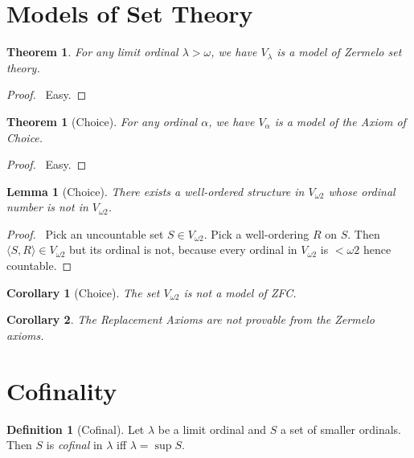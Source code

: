 \documentclass{article}
\let\qed\relax
\newtheorem{lemma}[axiom]{Lemma}
\newtheorem{theorem}[axiom]{Theorem}
\newtheorem{corollary}{Corollary}[axiom]
\theoremstyle{definition}
\newtheorem{definition}[axiom]{Definition}
\begin{document}
    \section{Models of Set Theory}

    \begin{theorem}
        For any limit ordinal $\lambda > \omega$, we have $V_\lambda$ is a model of Zermelo set theory.
    \end{theorem}

    \begin{proof}
        \pf\ Easy. \qed
    \end{proof}

    \begin{theorem}[Choice]
        For any ordinal $\alpha$, we have $V_\alpha$ is a model of the Axiom of Choice.
    \end{theorem}

    \begin{proof}
        \pf\ Easy. \qed
    \end{proof}

    \begin{lemma}[Choice]
        There exists a well-ordered structure in $V_{\omega 2}$ whose ordinal number is not in $V_{\omega 2}$.
    \end{lemma}

    \begin{proof}
        \pf\ Pick an uncountable set $S \in V_{\omega 2}$. Pick a well-ordering $R$ on $S$. Then
        $\langle S,R \rangle \in V_{\omega 2}$ but its ordinal is not, because every ordinal in
        $V_{\omega 2}$ is $< \omega 2$ hence countable. \qed
    \end{proof}

    \begin{corollary}[Choice]
        The set $V_{\omega 2}$ is not a model of ZFC.
    \end{corollary}

    \begin{corollary}
        The Replacement Axioms are not provable from the Zermelo axioms.
    \end{corollary}

    \section{Cofinality}

    \begin{definition}[Cofinal]
        Let $\lambda$ be a limit ordinal and $S$ a set of smaller ordinals. Then $S$ is \emph{cofinal} in
        $\lambda$ iff $\lambda = \sup S$.
    \end{definition}
\end{document}
